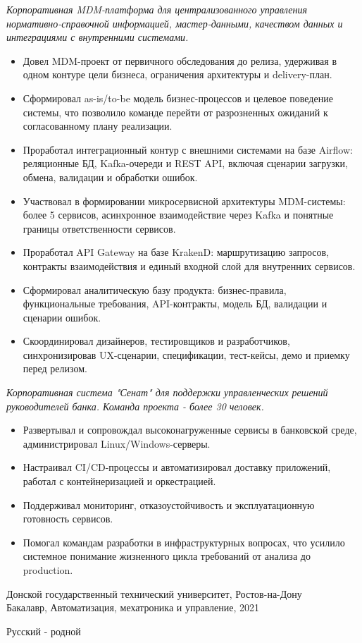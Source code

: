 \textit{Корпоративная MDM-платформа для централизованного управления нормативно-справочной информацией, мастер-данными, качеством данных и интеграциями с внутренними системами.}
\begin{itemize}[leftmargin=1.3em, itemsep=0.2em]
  \item Довел MDM-проект от первичного обследования до релиза, удерживая в одном контуре цели бизнеса, ограничения архитектуры и delivery-план.
  \item Сформировал as-is/to-be модель бизнес-процессов и целевое поведение системы, что позволило команде перейти от разрозненных ожиданий к согласованному плану реализации.
  \item Проработал интеграционный контур с внешними системами на базе Airflow: реляционные БД, Kafka-очереди и REST API, включая сценарии загрузки, обмена, валидации и обработки ошибок.
  \item Участвовал в формировании микросервисной архитектуры MDM-системы: более 5 сервисов, асинхронное взаимодействие через Kafka и понятные границы ответственности сервисов.
  \item Проработал API Gateway на базе KrakenD: маршрутизацию запросов, контракты взаимодействия и единый входной слой для внутренних сервисов.
  \item Сформировал аналитическую базу продукта: бизнес-правила, функциональные требования, API-контракты, модель БД, валидации и сценарии ошибок.
  \item Скоординировал дизайнеров, тестировщиков и разработчиков, синхронизировав UX-сценарии, спецификации, тест-кейсы, демо и приемку перед релизом.
\end{itemize}

\textit{Корпоративная система "Сенат" для поддержки управленческих решений руководителей банка. Команда проекта - более 30 человек.}
\begin{itemize}[leftmargin=1.3em, itemsep=0.2em]
  \item Развертывал и сопровождал высоконагруженные сервисы в банковской среде, администрировал Linux/Windows-серверы.
  \item Настраивал CI/CD-процессы и автоматизировал доставку приложений, работал с контейнеризацией и оркестрацией.
  \item Поддерживал мониторинг, отказоустойчивость и эксплуатационную готовность сервисов.
  \item Помогал командам разработки в инфраструктурных вопросах, что усилило системное понимание жизненного цикла требований от анализа до production.
\end{itemize}

Донской государственный технический университет, Ростов-на-Дону\\
Бакалавр, Автоматизация, мехатроника и управление, 2021

Русский - родной
